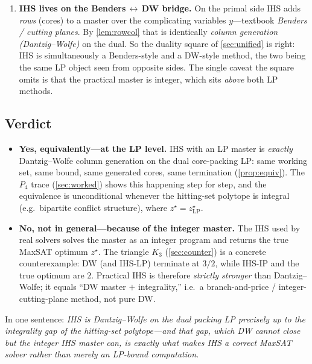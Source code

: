 \begin{enumerate}[label=\textbf{\arabic*.}, leftmargin=*]
\item \textbf{IHS lives on the Benders$\,\leftrightarrow\,$DW bridge.}
On the primal side IHS adds \emph{rows} (cores) to a master over the
complicating variables $y$---textbook \emph{Benders / cutting planes}. By
\cref{lem:rowcol} that is identically \emph{column generation
(Dantzig--Wolfe)} on the dual. So the duality square of \cref{sec:unified}
is right: IHS is simultaneously a Benders-style and a DW-style method, the two
being the same LP object seen from opposite sides. The single caveat the square
omits is that the practical master is integer, which sits \emph{above} both LP
methods.
\end{enumerate}


\subsection{Verdict}
\label{sec:verdict}

\begin{itemize}
\item \textbf{Yes, equivalently---at the LP level.} IHS with an LP master is
\emph{exactly} Dantzig--Wolfe column generation on the dual core-packing LP:
same working set, same bound, same generated cores, same termination
(\cref{prop:equiv}). The $P_4$ trace (\cref{sec:worked}) shows this
happening step for step, and the equivalence is unconditional whenever the
hitting-set polytope is integral (e.g.\ bipartite conflict structure), where
$z^\star = z^\star_{\mathrm{LP}}$.

\item \textbf{No, not in general---because of the integer master.} The IHS used
by real solvers solves the master as an integer program and returns the true
MaxSAT optimum $z^\star$. The triangle $K_3$ (\cref{sec:counter}) is a concrete
counterexample: DW (and IHS-LP) terminate at $3/2$, while IHS-IP and the true
optimum are $2$. Practical IHS is therefore \emph{strictly stronger} than
Dantzig--Wolfe; it equals ``DW master $+$ integrality,'' i.e.\ a branch-and-price
/ integer-cutting-plane method, not pure DW.
\end{itemize}

\noindent
In one sentence: \emph{IHS is Dantzig--Wolfe on the dual packing LP precisely up
to the integrality gap of the hitting-set polytope---and that gap, which DW
cannot close but the integer IHS master can, is exactly what makes IHS a correct
MaxSAT solver rather than merely an LP-bound computation.}


